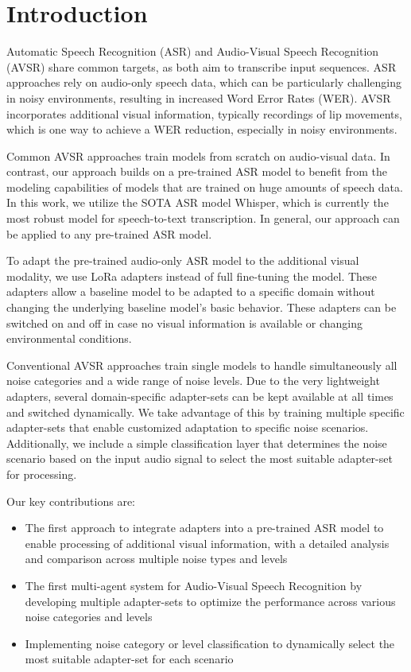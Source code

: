 \section{Introduction}

Automatic Speech Recognition (ASR) and Audio-Visual Speech Recognition (AVSR) share common targets, as both aim to transcribe input sequences. ASR approaches rely on audio-only speech data, which can be particularly challenging in noisy environments, resulting in increased Word Error Rates (WER).
AVSR incorporates additional visual information, typically recordings of lip movements, which is one way to achieve a WER reduction, especially in noisy environments.

Common AVSR approaches train models from scratch on audio-visual data. In contrast, our approach builds on a pre-trained ASR model to benefit from the modeling capabilities of models that are trained on huge amounts of speech data. In this work, we utilize the SOTA ASR model Whisper, which is currently the most robust model for speech-to-text transcription. In general, our approach can be applied to any pre-trained ASR model. 

To adapt the pre-trained audio-only ASR model to the additional visual modality, we use LoRa adapters instead of full fine-tuning the model. These adapters allow a baseline model to be adapted to a specific domain without changing the underlying baseline model's basic behavior. These adapters can be switched on and off in case no visual information is available or changing environmental conditions. 

Conventional AVSR approaches train single models to handle simultaneously all noise categories and a wide range of noise levels. Due to the very lightweight adapters, several domain-specific adapter-sets can be kept available at all times and switched dynamically. We take advantage of this by training multiple specific adapter-sets that enable customized adaptation to specific noise scenarios. Additionally, we include a simple classification layer that determines the noise scenario based on the input audio signal to select the most suitable adapter-set for processing.


Our key contributions are: 
\begin{itemize} 
\item The first approach to integrate adapters into a pre-trained ASR model to enable processing of additional visual information, with a detailed analysis and comparison across multiple noise types and levels
\item The first multi-agent system for Audio-Visual Speech Recognition by developing multiple adapter-sets to optimize the performance across various noise categories and levels
\item Implementing noise category or level classification to dynamically select the most suitable adapter-set for each scenario
\end{itemize}